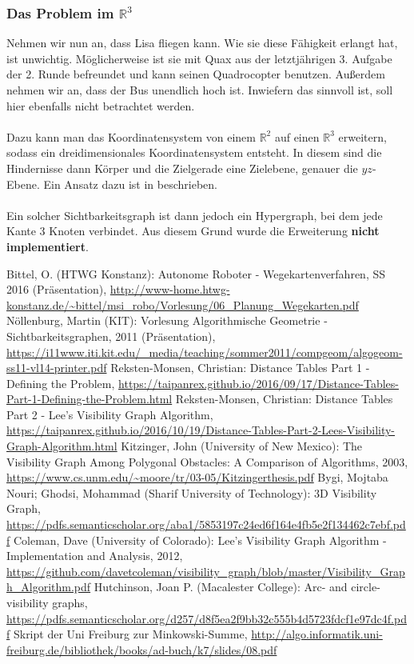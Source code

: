 \documentclass[a4paper, notitlepage, 12pt]{scrartcl}
\begin{document}
 \subsubsection{Das Problem im $\mathbb{R}^{3}$}
 Nehmen wir nun an, dass Lisa fliegen kann. Wie sie diese Fähigkeit erlangt hat, ist unwichtig. Möglicherweise ist sie mit Quax aus der letztjährigen 3. Aufgabe der 2. Runde befreundet und kann seinen Quadrocopter benutzen. Außerdem nehmen wir an, dass der Bus unendlich hoch ist. Inwiefern das sinnvoll ist, soll hier ebenfalls nicht betrachtet werden. \\ \\
 Dazu kann man das Koordinatensystem von einem $\mathbb{R}^{2}$ auf einen $\mathbb{R}^{3}$ erweitern, sodass ein dreidimensionales Koordinatensystem entsteht. In diesem sind die Hindernisse dann Körper und die Zielgerade eine Zielebene, genauer die $yz$-Ebene. Ein Ansatz dazu ist in \cite{Src:3dvis} beschrieben. \\ \\
 Ein solcher Sichtbarkeitsgraph ist dann jedoch ein Hypergraph, bei dem jede Kante 3 Knoten verbindet. Aus diesem Grund wurde die Erweiterung \textbf{nicht implementiert}. 
\begin{thebibliography}{xx}
 Bittel, O. (HTWG Konstanz): Autonome Roboter - Wegekartenverfahren, SS 2016 (Präsentation), \url{http://www-home.htwg-konstanz.de/~bittel/msi_robo/Vorlesung/06_Planung_Wegekarten.pdf}
 Nöllenburg, Martin (KIT): Vorlesung Algorithmische Geometrie - Sichtbarkeitsgraphen, 2011 (Präsentation), \url{https://i11www.iti.kit.edu/_media/teaching/sommer2011/compgeom/algogeom-ss11-vl14-printer.pdf}
 Reksten-Monsen, Christian: Distance Tables Part 1 - Defining the Problem, \url{https://taipanrex.github.io/2016/09/17/Distance-Tables-Part-1-Defining-the-Problem.html}
 Reksten-Monsen, Christian: Distance Tables Part 2 - Lee's Visibility Graph Algorithm, \url{https://taipanrex.github.io/2016/10/19/Distance-Tables-Part-2-Lees-Visibility-Graph-Algorithm.html}
 Kitzinger, John (University of New Mexico): The Visibility Graph Among Polygonal Obstacles: A Comparison of Algorithms, 2003, \url{https://www.cs.unm.edu/~moore/tr/03-05/Kitzingerthesis.pdf}
 Bygi, Mojtaba Nouri; Ghodsi, Mohammad (Sharif University of Technology): 3D Visibility Graph, \url{https://pdfs.semanticscholar.org/aba1/5853197c24ed6f164e4fb5e2f134462c7ebf.pdf}
 Coleman, Dave (University of Colorado): Lee's Visibility Graph Algorithm - Implementation and Analysis, 2012, \url{https://github.com/davetcoleman/visibility_graph/blob/master/Visibility_Graph_Algorithm.pdf}
 Hutchinson, Joan P. (Macalester College): Arc- and circle-visibility graphs, \url{https://pdfs.semanticscholar.org/d257/d8f5ea2f9bb32c555b4d5723fdcf1e97dc4f.pdf}
 Skript der Uni Freiburg zur Minkowski-Summe, \url{http://algo.informatik.uni-freiburg.de/bibliothek/books/ad-buch/k7/slides/08.pdf}
\end{thebibliography}
\end{document}
